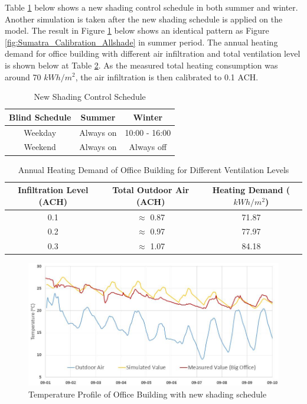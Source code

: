 \documentclass[a4paper, oneside]{discothesis}
\begin{document}
			Table \ref{tab:HonggShadingCtrl} below shows a new shading control schedule in both summer and winter. Another simulation is taken after the new shading schedule is applied on the model. The result in Figure \ref{fig:Sumatra_Calibration_NewShading} below shows an identical pattern as Figure \ref{fig:Sumatra_Calibration_Allshade} in summer period. The annual heating demand for office building with different air infiltration and total ventilation level is shown below at Table \ref{tab:SumatraVentLevel}. As the measured total heating consumption was around 70 $kWh/m^2$, the air infiltration is then calibrated to 0.1 ACH.\\
			
		\begin{table}[htbp]
		\centering
		\caption{New Shading Control Schedule}
		    \begin{tabular}{ccc}
		    \toprule
		    Blind Schedule & Summer & Winter\\
		    \midrule
            Weekday & Always on & 10:00 - 16:00 \\
            Weekend & Always on & Always off\\
		    \bottomrule
		    \end{tabular}%
		  \label{tab:HonggShadingCtrl}%
		\end{table}%
            
            
		\begin{table}[htbp]
		\centering
		\caption{Annual Heating Demand of Office Building for Different Ventilation Levels}
		    \begin{tabular}{ccc}
		    \toprule
		    Infiltration Level (ACH) & Total Outdoor Air (ACH) & Heating Demand ($kWh/m^2$)\\
		    \midrule
            0.1 & $\approx$ 0.87 & 71.87\\
            0.2 & $\approx$ 0.97 & 77.97\\
            0.3 & $\approx$ 1.07 & 84.18\\
            
		    \bottomrule
		    \end{tabular}%
		  \label{tab:SumatraVentLevel}%
		\end{table}%
		
		
            \begin{figure}[H]
			\centering
			\includegraphics[scale=0.65]{Sumatra_Calibration_NewShading.JPG}
			\caption{Temperature Profile of Office Building with new shading schedule}
			\label{fig:Sumatra_Calibration_NewShading}
			\end{figure}
	
\end{document}
